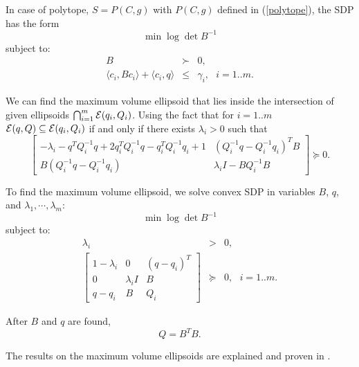In case of polytope, $S=P(C,g)$ with $P(C,g)$ defined in (\ref{polytope}),
the SDP has the form
\[ \min \log \det B^{-1} \]
subject to:
\begin{eqnarray*}
B & \succ & 0,\\
\langle c_i, Bc_i\rangle + \langle c_i, q\rangle & \leq & \gamma_i,
~~~ i=1..m.
\end{eqnarray*}

We can find the maximum volume ellipsoid that lies inside the intersection
of given ellipsoids $\bigcap_{i=1}^m\EE(q_i,Q_i)$.
Using the fact that for $i=1..m$ $\EE(q,Q)\subseteq\EE(q_i,Q_i)$ if and only
if there exists $\lambda_i>0$ such that
\[
\left[\begin{array}{cc}
-\lambda_i - q^TQ_i^{-1}q + 2q_i^TQ_i^{-1}q - q_i^TQ_i^{-1}q_i + 1 & (Q_i^{-1}q-Q_i^{-1}q_i)^TB\\
B(Q_i^{-1}q-Q_i^{-1}q_i) & \lambda_iI-BQ_i^{-1}B\end{array}\right] \succeq 0.
\]

To find the maximum volume ellipsoid, we solve convex SDP in variables
$B$, $q$, and $\lambda_1,\cdots,\lambda_m$:
\[ \min \log \det B^{-1} \]
subject to:
\begin{eqnarray*}
\lambda_i & > & 0, \\
\left[\begin{array}{ccc}
1-\lambda_i & 0 & (q - q_i)^T\\
0 & \lambda_iI & B\\
q - q_i & B & Q_i\end{array}\right] & \succeq & 0, ~~~ i=1..m.
\end{eqnarray*}

After $B$ and $q$ are found,
\[ Q = B^TB. \]

The results on the maximum volume ellipsoids are explained
and proven in \cite{boyd2}.

